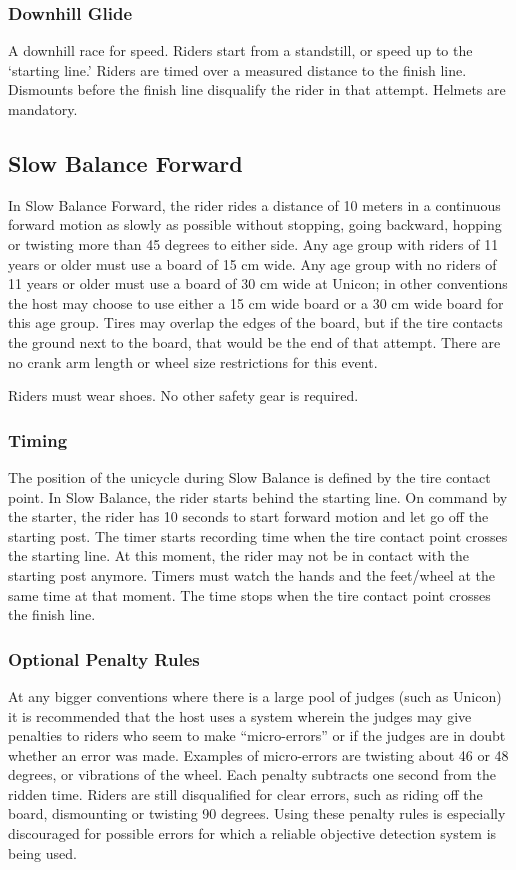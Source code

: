 \subsubsection{Downhill Glide}
A downhill race for speed.
Riders start from a standstill, or speed up to the `starting line.'
Riders are timed over a measured distance to the finish line.
Dismounts before the finish line disqualify the rider in that attempt.
Helmets are mandatory.

\subsection{Slow Balance Forward}

In Slow Balance Forward, the rider rides a distance of 10 meters in a continuous forward motion as slowly as possible without stopping, going backward, hopping or twisting more than 45 degrees to either side.
Any age group with riders of 11 years or older must use a board of 15 cm wide.
Any age group with no riders of 11 years or older must use a board of 30 cm wide at Unicon; in other conventions the host may choose to use either a 15 cm wide board or a 30 cm wide board for this age group.
Tires may overlap the edges of the board, but if the tire contacts the ground next to the board, that would be the end of that attempt.
There are no crank arm length or wheel size restrictions for this event.

Riders must wear shoes.
No other safety gear is required.

\subsubsection{Timing}
The position of the unicycle during Slow Balance is defined by the tire contact point.
In Slow Balance, the rider starts behind the starting line.
On command by the starter, the rider has 10 seconds to start forward motion and let go off the starting post.
The timer starts recording time when the tire contact point crosses the starting line.
At this moment, the rider may not be in contact with the starting post anymore.
Timers must watch the hands and the feet/wheel at the same time at that moment.
The time stops when the tire contact point crosses the finish line.

\subsubsection{Optional Penalty Rules}
At any bigger conventions where there is a large pool of judges (such as Unicon) it is recommended that the host uses a system wherein the judges may give penalties to riders who seem to make ``micro-errors'' or if the judges are in doubt whether an error was made.
Examples of micro-errors are twisting about 46 or 48 degrees, or vibrations of the wheel.
Each penalty subtracts one second from the ridden time.
Riders are still disqualified for clear errors, such as riding off the board, dismounting or twisting 90 degrees.
Using these penalty rules is especially discouraged for possible errors for which a reliable objective detection system is being used.

